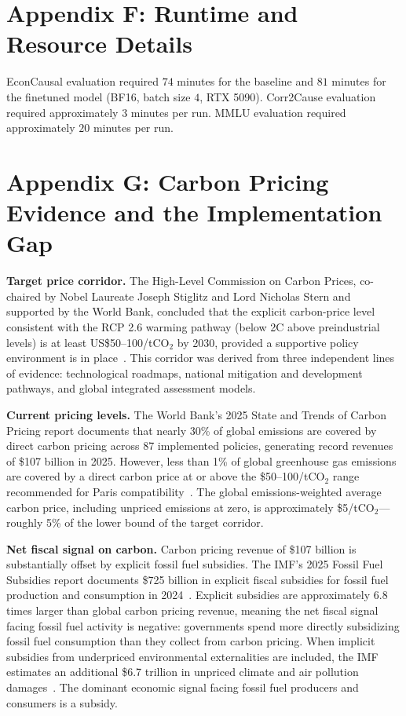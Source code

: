 \documentclass[sigconf]{acmart}
\begin{document}
\section{Appendix F: Runtime and Resource Details}

EconCausal evaluation required $74$ minutes for the baseline and $81$ minutes for the finetuned model (BF16, batch size $4$, RTX 5090). Corr2Cause evaluation required approximately $3$ minutes per run. MMLU evaluation required approximately $20$ minutes per run.

\section{Appendix G: Carbon Pricing Evidence and the Implementation Gap}

\textbf{Target price corridor.} The High-Level Commission on Carbon Prices, co-chaired by Nobel Laureate Joseph Stiglitz and Lord Nicholas Stern and supported by the World Bank, concluded that the explicit carbon-price level consistent with the RCP 2.6 warming pathway (below 2C above preindustrial levels) is at least US\$50--100/tCO$_2$ by 2030, provided a supportive policy environment is in place~\cite{carbonpricingleadership2017}. This corridor was derived from three independent lines of evidence: technological roadmaps, national mitigation and development pathways, and global integrated assessment models.

\textbf{Current pricing levels.} The World Bank's 2025 State and Trends of Carbon Pricing report documents that nearly 30\% of global emissions are covered by direct carbon pricing across 87 implemented policies, generating record revenues of \$107 billion in 2025. However, less than 1\% of global greenhouse gas emissions are covered by a direct carbon price at or above the \$50--100/tCO$_2$ range recommended for Paris compatibility~\cite{worldbank2024statetrends}. The global emissions-weighted average carbon price, including unpriced emissions at zero, is approximately \$5/tCO$_2$---roughly 5\% of the lower bound of the target corridor.

\textbf{Net fiscal signal on carbon.} Carbon pricing revenue of \$107 billion is substantially offset by explicit fossil fuel subsidies. The IMF's 2025 Fossil Fuel Subsidies report documents \$725 billion in explicit fiscal subsidies for fossil fuel production and consumption in 2024~\cite{imf2025fossilfuelsubsidies}. Explicit subsidies are approximately 6.8 times larger than global carbon pricing revenue, meaning the net fiscal signal facing fossil fuel activity is negative: governments spend more directly subsidizing fossil fuel consumption than they collect from carbon pricing. When implicit subsidies from underpriced environmental externalities are included, the IMF estimates an additional \$6.7 trillion in unpriced climate and air pollution damages~\cite{imf2025fossilfuelsubsidies}. The dominant economic signal facing fossil fuel producers and consumers is a subsidy.
\end{document}
